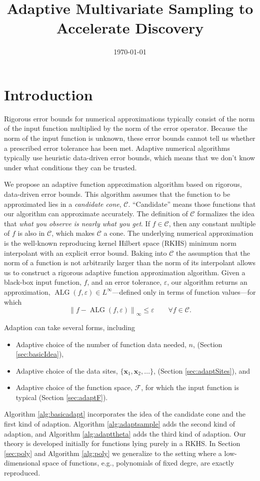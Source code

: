 \documentclass[]{mcom-l}
\title{Adaptive Multivariate Sampling to Accelerate Discovery}
\author{}
\date{\today}
\theoremstyle{remark}
\DeclareMathOperator{\ALG}{ALG}
\newcommand{\bx}{{\boldsymbol{x}}}
\newcommand{\cc}{\mathcal{C}}
\newcommand{\calf}{{\mathcal{F}}}
\newcommand{\norm}[2][{}]{\ensuremath{\left \lVert #2 \right \rVert}_{#1}}
\begin{document}
\maketitle

\section{Introduction}
Rigorous error bounds for numerical approximations typically consist of the norm of the input function multiplied by the norm of the error operator.  Because the norm of the input function is unknown, these error bounds cannot tell us whether a prescribed error tolerance has been met.  Adaptive numerical algorithms typically use heuristic data-driven error bounds, which means that we don't know under what conditions they can be trusted.

We propose an adaptive function approximation algorithm based on rigorous, data-driven error bounds.  This algorithm assumes that the function to be approximated lies in a \emph{candidate cone}, $\cc$.  ``Candidate'' means those functions that our algorithm can approximate accurately.  The definition of $\cc$ formalizes the idea that \emph{what you observe is nearly what you get}.  If $f \in \cc$, then any constant multiple of $f$ is also in $\cc$, which makes $\cc$ a cone.  The underlying numerical approximation is the well-known reproducing kernel Hilbert space (RKHS) minimum norm interpolant with an explicit error bound.  Baking into $\cc$ the assumption that the norm of a function is not arbitrarily larger than the norm of its interpolant allows us to construct a rigorous adaptive function approximation algorithm. Given a black-box input function, $f$, and an error tolerance, $\varepsilon$, our algorithm returns an approximation, $\ALG(f,\varepsilon) \in L^\infty$---defined only in terms of function values---for which 
\begin{equation} \label{eq:errorcrit}
\norm[\infty]{f - \ALG(f,\varepsilon)} \le \varepsilon \qquad \forall f\in \cc.
\end{equation}

Adaption can take several forms, including
\begin{itemize}
    \item Adaptive choice of the number of function data needed, $n$, (Section \ref{sec:basicIdea}),
    \item Adaptive choice of the data sites, $\{\bx_1, \bx_2, \ldots\}$,  (Section \ref{sec:adaptSites}), and
    \item Adaptive choice of the function space, $\calf$, for which the input function is typical  (Section \ref{sec:adaptF}).
\end{itemize}
Algorithm \ref{alg:basicadapt} incorporates the idea of the candidate cone and the first kind of adaption.  Algorithm \ref{alg:adaptsample} adds the second kind of adaption, and Algorithm \ref{alg:adapttheta} adds the third kind of adaption.  Our theory is developed initially for functions lying purely in a RKHS.  In Section \ref{sec:poly} and Algorithm \ref{alg:poly} we generalize to the setting where a low-dimensional space of functions, e.g., polynomials of fixed degre, are exactly reproduced.
\end{document}
